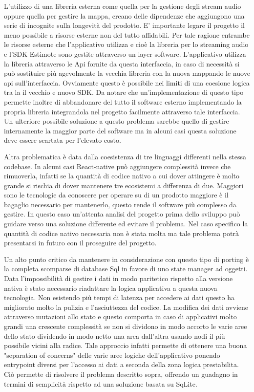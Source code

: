 L’utilizzo di una libreria esterna come quella per la gestione degli stream audio oppure quella per gestire la mappa, creano delle dipendenze che aggiungono una serie di incognite sulla longevità del prodotto. E’ importante legare il progetto il meno possibile a risorse esterne non del tutto affidabili. Per tale ragione entrambe le risorse esterne che l’applicativo utilizza e cioè la libreria per lo streaming audio e l’SDK Estimote sono gestite attraverso un layer software. L’applicativo utilizza la libreria attraverso le Api fornite da questa interfaccia, in caso di necessità si può sostituire più agevolmente la vecchia libreria con la nuova mappando le nuove api sull’interfaccia. Ovviamente questo è possibile nei limiti di una coesione logica tra la il vecchio e nuovo SDK. Da notare che un'implementazione di questo tipo permette inoltre di abbandonare del tutto il software esterno implementando la propria libreria integrandola nel progetto facilmente attraverso tale interfaccia. Un ulteriore possibile soluzione a questo problema sarebbe quello di gestire internamente la maggior parte del software ma in alcuni casi questa soluzione deve essere scartata per l’elevato costo.\vspace{5mm}

Altra problematica è data dalla coesistenza di tre linguaggi differenti nella stessa codebase. In alcuni casi React-native può aggiungere complessità invece che rimuoverla, infatti se la quantità di codice nativo a cui dover attingere è molto grande si rischia di dover mantenere tre ecosistemi a differenza di due. Maggiori sono le tecnologie da conoscere per operare su di un prodotto maggiore è il bagaglio necessario per mantenerlo, questo rende il software più complesso da gestire. In questo caso un'attenta analisi del progetto prima dello sviluppo può guidare verso una soluzione differente ed evitare il problema. Nel caso specifico la quantità di codice nativo necessaria non è stata molta ma tale problema potrà presentarsi in futuro con il proseguire del progetto.\vspace{5mm}

Un alto punto critico da mantenere in considerazione con questo tipo di porting è la completa scomparse di database Sql in favore di uno state manager ad oggetti. Data l'impossibilità di gestire i dati in modo paritetico rispetto alla versione nativa è stato necessario riadattare la logica applicativa a questa nuova tecnologia. Non esistendo più tempi di latenza per accedere ai dati questo ha migliorato molto la pulizia e l'asciuttezza del codice. La modifica dei dati avviene attraverso mutazioni allo stato e questo comporta in caso di applicativi molto grandi una crescente complessità se non si dividono in modo accorto le varie aree dello stato dividendo in modo netto una area dall'altra usando nodi il più possibile vicini alla radice. Tale approccio infatti permette di ottenere una buona "separation of concerns"\cite{SOC} delle varie aree logiche dell'applicativo ponendo entrypoint diversi per l'accesso ai dati a seconda della zona logica prestabilita. Ciò permette di risolvere il problema descritto sopra, offrendo un guadagno in termini di semplicità rispetto ad una soluzione basata su SqLite.

